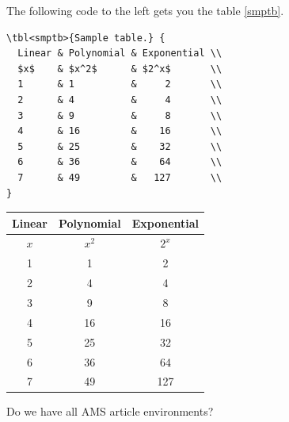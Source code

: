 \documentclass{homework}
\begin{document}
\begin{sol}
  The following code to the left gets you the table \ref{smptb}.

  \medskip
  \begin{minipage}{0.45\textwidth}
    \begin{verbatim}
\tbl<smptb>{Sample table.} {
  Linear & Polynomial & Exponential \\
  $x$    & $x^2$      & $2^x$       \\
  1      & 1          &     2       \\
  2      & 4          &     4       \\
  3      & 9          &     8       \\
  4      & 16         &    16       \\
  5      & 25         &    32       \\
  6      & 36         &    64       \\
  7      & 49         &   127       \\
}
    \end{verbatim}
  \end{minipage}
  \hfill
  \begin{minipage}{0.45\textwidth} \hspace{1.9em}
    \begin{tabular}{ccc}
      \toprule
      Linear & Polynomial & Exponential \\
      \midrule
      $x$    & $x^2$      & $2^x$       \\
      1      & 1          & 2           \\
      2      & 4          & 4           \\
      3      & 9          & 8           \\
      4      & 16         & 16          \\
      5      & 25         & 32          \\
      6      & 36         & 64          \\
      7      & 49         & 127         \\
      \bottomrule
    \end{tabular}
    \captionsetup{type=table}
    \label{smptb}
  \end{minipage}
\end{sol}

\question Do we have all AMS article environments?
\end{document}
